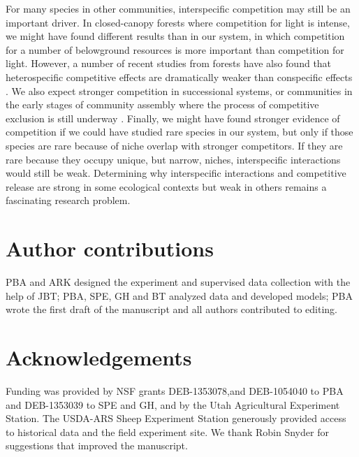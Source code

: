 \documentclass[11pt]{article}
\begin{document}
\begin{doublespacing}
For many species in other communities, interspecific competition may still be an important driver. In closed-canopy 
forests where competition for light is intense, we might have found different results than in our system, in which 
competition for a number of belowground resources is more important than competition for light. However, a 
number of recent studies from forests have also found that heterospecific competitive effects are dramatically 
weaker than conspecific effects \citep{comita_asymmetric_2010,Kunstler2016,johnson_conspecific_2012}.  We also 
expect stronger competition in successional systems, or communities in the early stages of community assembly 
where the process of competitive exclusion is still underway \citep{kokkoris_patterns_1999}. Finally, we might have
found stronger evidence of competition if we could have studied rare species in our system, but only if those species 
are rare because of niche overlap with stronger competitors. If they are rare because they occupy unique, but narrow, niches, 
interspecific interactions would still be weak. Determining why interspecific interactions and competitive release are 
strong in some ecological contexts but weak in others remains a fascinating research problem. 

\section*{Author contributions}
PBA and ARK designed the experiment and supervised data collection with the help of JBT; PBA, SPE, GH and BT analyzed data and 
developed models; PBA wrote the first draft of the manuscript and all authors contributed to editing.

\section*{Acknowledgements}
Funding was provided by NSF grants DEB-1353078,and  DEB-1054040 to PBA and DEB-1353039 to SPE and GH, and by the Utah Agricultural Experiment Station. 
The USDA-ARS Sheep Experiment Station generously provided access to historical data and the field experiment site. 
We thank Robin Snyder for suggestions that improved the manuscript.





\end{doublespacing} 

\end{document}
